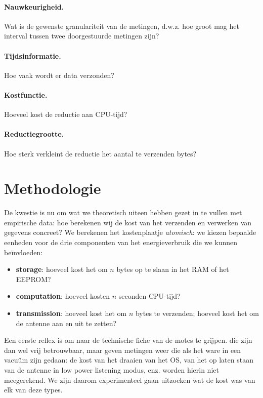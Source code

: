 \documentclass{article}
\begin{document}
\paragraph{Nauwkeurigheid.} Wat is de gewenste granulariteit van de metingen,
d.w.z. hoe groot mag het interval tussen twee doorgestuurde metingen zijn?
\paragraph{Tijdsinformatie.} Hoe vaak wordt er data verzonden?
\paragraph{Kostfunctie.} Hoeveel kost de reductie aan CPU-tijd?
\paragraph{Reductiegrootte.} Hoe sterk verkleint de reductie het aantal te
verzenden bytes?

\section{Methodologie}

De kwestie is nu om wat we theoretisch uiteen hebben gezet in te vullen met
empirische data: hoe berekenen wij de kost van het verzenden en verwerken van
gegevens concreet? We berekenen het kostenplaatje \textit{atomisch}: we kiezen
bepaalde eenheden voor de drie componenten van het energieverbruik die we kunnen
be\"invloeden:

\begin{itemize}
\item \textbf{storage}: hoeveel kost het om $n$ bytes op te slaan in het RAM of
het EEPROM? 
\item \textbf{computation}: hoeveel kosten $n$ seconden CPU-tijd?
\item \textbf{transmission}: hoeveel kost het om $n$ bytes te verzenden; hoeveel
kost het om de antenne aan en uit te zetten?
\end{itemize}

Een eerste reflex is om naar de technische fiche van de motes te grijpen. die
zijn dan wel vrij betrouwbaar, maar geven metingen weer die als het ware in een
vacu\"um zijn gedaan: de kost van het draaien van het OS, van het op laten staan
van de antenne in low power listening modus, enz. worden hierin niet
meegerekend. We zijn daarom experimenteel gaan uitzoeken wat de kost was van elk
van deze types.
\end{document}
